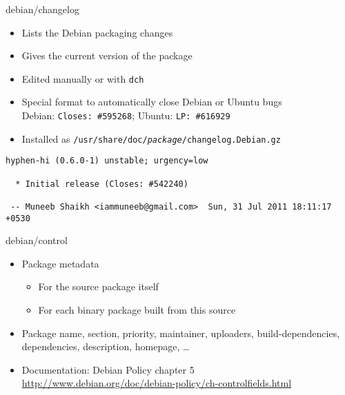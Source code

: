 \documentclass[red,10pt,a4paper]{beamer}
\begin{document}
\begin{frame}[fragile]{debian/changelog}
  \begin{itemize}
  \item Lists the Debian packaging changes
  \item Gives the current version of the package
  \begin{center}
\end{center}


  \item Edited manually or with \texttt{dch}
  \item Special format to automatically close Debian or Ubuntu bugs\\
    Debian: \texttt{Closes:~\#595268}; Ubuntu: \texttt{LP:~\#616929}
  \item Installed as \texttt{/usr/share/doc/\textit{package}/changelog.Debian.gz}
  \end{itemize}
  \seprule
  \begin{lstlisting}[basicstyle=\ttfamily\footnotesize]
hyphen-hi (0.6.0-1) unstable; urgency=low

  * Initial release (Closes: #542240) 

 -- Muneeb Shaikh <iammuneeb@gmail.com>  Sun, 31 Jul 2011 18:11:17 +0530
\end{lstlisting}
\end{frame}

\begin{frame}[fragile]{debian/control}
  \hbr
  \begin{itemize}
  \item Package metadata
    \begin{itemize}
    \item For the source package itself
    \item For each binary package built from this source
    \end{itemize}
    \hbr
  \item Package name, section, priority, maintainer, uploaders,
    build-dependencies, dependencies, description, homepage, \ldots \hbr
  \item Documentation: Debian Policy chapter 5\\
    \url{http://www.debian.org/doc/debian-policy/ch-controlfields.html}
  \end{itemize}

\end{frame}
\end{document}
